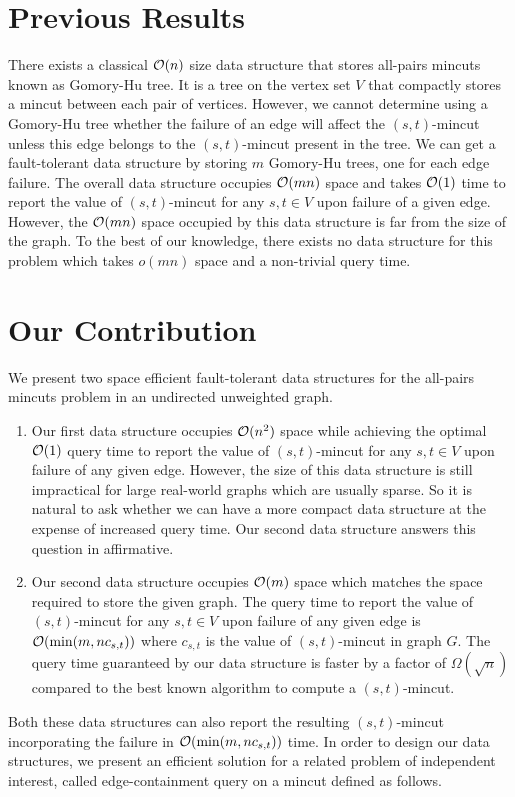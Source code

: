 \section{Previous Results} 


There exists a classical ${\cal O}(n)$ size data structure that stores all-pairs mincuts \cite{GH61} known as Gomory-Hu tree. It is a tree on the vertex set $V$ that compactly stores a mincut between each pair of vertices. However, we cannot determine using a Gomory-Hu tree whether the failure of an edge will affect the $(s,t)$-mincut unless this edge belongs to the $(s,t)$-mincut present in the tree. We can get a fault-tolerant data structure by storing $m$ Gomory-Hu trees, one for each edge failure. The overall data structure occupies ${\cal O}(mn)$ space and takes ${\cal O}(1)$ time to report the value of $(s,t)$-mincut for any $s,t\in V$ upon failure of a given edge. However, the ${\cal O}(mn)$ space occupied by this data structure is far from the size of the graph. To the best of our knowledge, there exists no data structure for this problem which takes $o(mn)$ space and a non-trivial query time.



\section{Our Contribution} We present two space efficient fault-tolerant data structures for the all-pairs mincuts problem in an undirected unweighted graph.

\begin{enumerate}
    \item 
Our first data structure occupies ${\cal O}(n^2)$ space while achieving the optimal ${\cal O}(1)$ query time to report the value of $(s,t)$-mincut for any $s,t\in V$ upon failure of any given edge. However, the size of this data structure is still impractical for large real-world graphs which are usually sparse. So it is natural to ask whether we can have a more compact data structure at the expense of increased query time. Our second data structure answers this question in affirmative.

    \item
Our second data structure occupies ${\cal O}(m)$ space which matches the space required to store the given graph.
The query time to report the value of $(s,t)$-mincut for any $s,t\in V$ upon failure of any given edge is ${\cal O}(\min(m,nc_{s,t}))$ where $c_{s,t}$ is the value of $(s,t)$-mincut in graph $G$. The query time guaranteed by our data structure is faster by a factor of $\Omega(\sqrt{n})$ compared to the best known algorithm \cite{DBLP:conf/focs/GoldbergR97a,DBLP:conf/stoc/KargerL98} to compute a $(s,t)$-mincut.

\end{enumerate}
Both these data structures can also report the resulting $(s,t)$-mincut incorporating the failure in ${\cal O}(\min(m,n c_{s,t}))$ time.
In order to design our data structures, we present an efficient solution for a related problem of independent interest, called edge-containment query on a mincut defined as follows.\\

